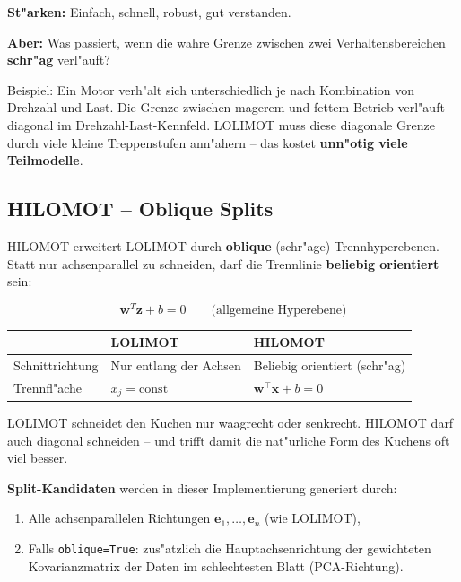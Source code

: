 \documentclass[12pt,a4paper]{article}
\begin{document}
\textbf{St"arken:} Einfach, schnell, robust, gut verstanden.

\begin{hinweisbox}
\textbf{Aber:} Was passiert, wenn die \glqq wahre\grqq{} Grenze zwischen zwei Verhaltensbereichen \textbf{schr"ag} verl"auft?

Beispiel: Ein Motor verh"alt sich unterschiedlich je nach Kombination von Drehzahl und Last. Die Grenze zwischen \glqq magerem\grqq{} und \glqq fettem\grqq{} Betrieb verl"auft diagonal im Drehzahl-Last-Kennfeld. LOLIMOT muss diese diagonale Grenze durch viele kleine Treppenstufen ann"ahern -- das kostet \textbf{unn"otig viele Teilmodelle}.
\end{hinweisbox}

\subsection{HILOMOT -- Oblique Splits}

HILOMOT erweitert LOLIMOT durch \textbf{oblique} (schr"age) Trennhyperebenen. Statt nur achsenparallel zu schneiden, darf die Trennlinie \textbf{beliebig orientiert} sein:

\begin{equation}
  \mathbf{w}^T \mathbf{z} + b = 0 \qquad \text{(allgemeine Hyperebene)}
\end{equation}

\begin{center}
\begin{tabular}{lll}
  \toprule
  & \textbf{LOLIMOT} & \textbf{HILOMOT} \\  \midrule
  Schnittrichtung & Nur entlang der Achsen & Beliebig orientiert (schr"ag) \\
  Trennfl"ache & $x_j = \mathrm{const}$ & $\mathbf{w}^\top \mathbf{x} + b = 0$ \\
  \bottomrule
\end{tabular}
\end{center}

\begin{analogiebox}
LOLIMOT schneidet den Kuchen nur waagrecht oder senkrecht. HILOMOT darf auch diagonal schneiden -- und trifft damit die nat"urliche Form des Kuchens oft viel besser.
\end{analogiebox}

\textbf{Split-Kandidaten} werden in dieser Implementierung generiert durch:
\begin{enumerate}
  \item Alle achsenparallelen Richtungen $\mathbf{e}_1, \ldots, \mathbf{e}_n$ (wie LOLIMOT),
  \item Falls \texttt{oblique=True}: zus"atzlich die Hauptachsenrichtung der gewichteten Kovarianzmatrix der Daten im schlechtesten Blatt (PCA-Richtung).
\end{enumerate}
\end{document}
